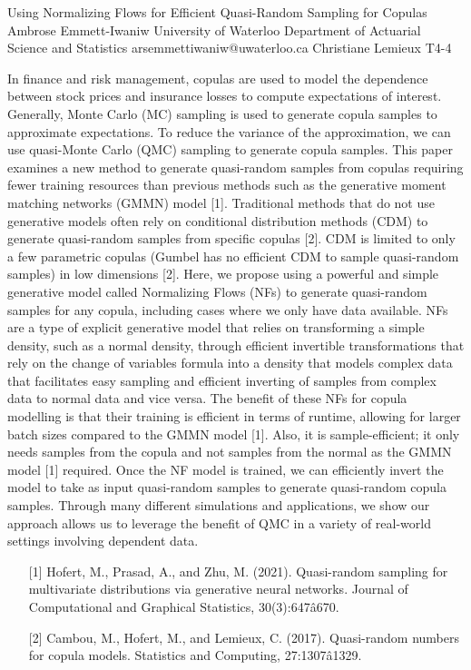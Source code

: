 \begin{talk}
  {Using Normalizing Flows for Efficient Quasi-Random Sampling for Copulas}%
  {Ambrose Emmett-Iwaniw}%
  {University of Waterloo Department of Actuarial Science and Statistics}%
  {arsemmettiwaniw@uwaterloo.ca}%
  {Christiane Lemieux}%
  {T4-4}%
			
In finance and risk management, copulas are used to model the dependence between stock prices and insurance losses to compute expectations of interest. Generally, Monte Carlo (MC) sampling is used to generate copula samples to approximate expectations. To reduce the variance of the approximation, we can use quasi-Monte Carlo (QMC) sampling to generate copula samples. This paper examines a new method to generate quasi-random samples from copulas requiring fewer training resources than previous methods such as the generative moment matching networks (GMMN) model [1]. Traditional methods that do not use generative models often rely on conditional distribution methods (CDM) to generate quasi-random samples from specific copulas [2]. CDM is limited to only a few parametric copulas (Gumbel has no efficient CDM to sample quasi-random samples) in low dimensions [2]. Here, we propose using a powerful and simple generative model called Normalizing Flows (NFs) to generate quasi-random samples for any copula, including cases where we only have data available. NFs are a type of explicit generative model that relies on transforming a simple density, such as a normal density, through efficient invertible transformations that rely on the change of variables formula into a density that models complex data that facilitates easy sampling and efficient inverting of samples from complex data to normal data and vice versa. The benefit of these NFs for copula modelling is that their training is efficient in terms of runtime, allowing for larger batch sizes compared to the GMMN model [1]. Also, it is sample-efficient; it only needs samples from the copula and not samples from the normal as the GMMN model [1] required. Once the NF model is trained, we can efficiently invert the model to take as input quasi-random samples to generate quasi-random copula samples. Through many different simulations and applications, we show our approach allows us to leverage the benefit of QMC in a variety of real-world settings involving dependent data.
\medskip

\begin{enumerate}
	\item[{[1]}] Hofert, M., Prasad, A., and Zhu, M. (2021). Quasi-random sampling for multivariate distributions via generative neural networks. Journal of Computational and Graphical Statistics,
30(3):647â670.
	\item[{[2]}] Cambou, M., Hofert, M., and Lemieux, C. (2017). Quasi-random numbers for copula models. Statistics and Computing, 27:1307â1329. 
\end{enumerate}
\end{talk}

